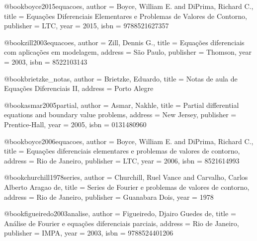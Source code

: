 @book{boyce2015equacoes,
  author = {Boyce, William E. and DiPrima, Richard C.},
  title = {Equações Diferenciais Elementares e Problemas de Valores de Contorno},
  publisher = {LTC},
  year = {2015},
  isbn = {9788521627357}
}

@book{zill2003equacoes,
  author = {Zill, Dennis G.},
  title = {Equações diferenciais com aplicações em modelagem},
  address = {São Paulo},
  publisher = {Thomson},
  year = {2003},
  isbn = {8522103143}%
}

@book{brietzke_notas,
  author = {Brietzke, Eduardo},
  title = {Notas de aula de Equações Diferenciais II},
  address = {Porto Alegre}
}

@book{asmar2005partial,
  author = {Asmar, Nakhle},
  title = {Partial differential equations and boundary value problems},
  address = {New Jersey},
  publisher = {Prentice-Hall},
  year = {2005},
  isbn = {0131480960}
}

@book{boyce2006equacoes,
  author = {Boyce, William E. and DiPrima, Richard C.},
  title = {Equações diferenciais elementares e problemas de valores de contorno},
  address = {Rio de Janeiro},
  publisher = {LTC},
  year = {2006},
  isbn = {8521614993}
}

@book{churchill1978series,
  author = {Churchill, Ruel Vance and Carvalho, Carlos Alberto Aragao de},
  title = {Series de Fourier e problemas de valores de contorno},
  address = {Rio de Janeiro},
  publisher = {Guanabara Dois},
  year = {1978}
}

@book{figueiredo2003analise,
  author = {Figueiredo, Djairo Guedes de},
  title = {Análise de Fourier e equações diferenciais parciais},
  address = {Rio de Janeiro},
  publisher = {IMPA},
  year = {2003},
  isbn = {9788524401206}
}

